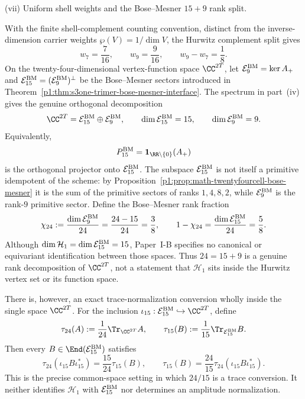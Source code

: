 \documentclass[11pt]{article}
\begin{document}
\begin{theorem}[\(m=1\) finite numerical data]
\smallskip
\noindent\textup{(vii) Uniform shell weights and the Bose--Mesner \(15+9\) rank split.}
\par\noindent
With the finite shell-complement counting convention, distinct from the
inverse-dimension carrier weights \(\wp(V)=1/\dim V\), the Hurwitz complement
split gives
\[
    w_7=\frac{7}{16},
    \qquad
    w_9=\frac{9}{16},
    \qquad
    w_9-w_7=\frac18.
\]
On the twenty-four-dimensional vertex-function space \(\CC^{2T}\), let
\(\mathcal E_9^{\rm BM}=\ker A_+\) and
\(\mathcal E_{15}^{\rm BM}=(\mathcal E_9^{\rm BM})^\perp\) be the
Bose--Mesner sectors introduced in
Theorem~\ref{p1:thm:s3one-trimer-bose-mesner-interface}.
The spectrum in part~\textup{(iv)} gives the genuine orthogonal
decomposition
\[
    \CC^{2T}=\mathcal E_{15}^{\rm BM}\oplus\mathcal E_9^{\rm BM},
    \qquad
    \dim\mathcal E_{15}^{\rm BM}=15,
    \qquad
    \dim\mathcal E_9^{\rm BM}=9.
\]
Equivalently,
\[
    P_{15}^{\rm BM}=\mathbf1_{\RR\setminus\{0\}}(A_+)
\]
is the orthogonal projector onto \(\mathcal E_{15}^{\rm BM}\).
The subspace \(\mathcal E_{15}^{\rm BM}\) is not itself a primitive idempotent of
the scheme: by Proposition~\ref{p1:prop:math-twentyfourcell-bose-mesner} it
is the sum of the primitive sectors of ranks \(1,4,8,2\), while
\(\mathcal E_9^{\rm BM}\) is the rank-\(9\) primitive sector.
Define the Bose--Mesner rank fraction
\[
    \chi_{24}:=\frac{\dim\mathcal E_9^{\rm BM}}{24}
    =\frac{24-15}{24}=\frac38,
    \qquad
    1-\chi_{24}
    =\frac{\dim\mathcal E_{15}^{\rm BM}}{24}
    =\frac58.
\]
Although \(\dim\mathcal H_1=\dim\mathcal E_{15}^{\rm BM}=15\), Paper~I-B specifies no
canonical or equivariant identification between those spaces.  Thus
\(24=15+9\) is a genuine rank decomposition of \(\CC^{2T}\), not a statement
that \(\mathcal H_1\) sits inside the Hurwitz vertex set or its function
space.

There is, however, an exact trace-normalization conversion wholly inside the
single space \(\CC^{2T}\).  For the inclusion
\(\iota_{15}:\mathcal E_{15}^{\rm BM}\hookrightarrow\CC^{2T}\), define
\[
    \tau_{24}(A):=\frac1{24}\Tr_{\CC^{2T}}A,
    \qquad
    \tau_{15}(B):=\frac1{15}\Tr_{\mathcal E_{15}^{\rm BM}}B.
\]
Then every \(B\in\End(\mathcal E_{15}^{\rm BM})\) satisfies
\[
    \tau_{24}(\iota_{15} B\iota_{15}^*)
    =\frac{15}{24}\tau_{15}(B),
    \qquad
    \tau_{15}(B)
    =\frac{24}{15}\tau_{24}(\iota_{15} B\iota_{15}^*).
\]
This is the precise common-space setting in which \(24/15\) is a trace
conversion.  It neither identifies \(\mathcal H_1\) with
\(\mathcal E_{15}^{\rm BM}\) nor determines an amplitude normalization.

\end{theorem}
\end{document}
